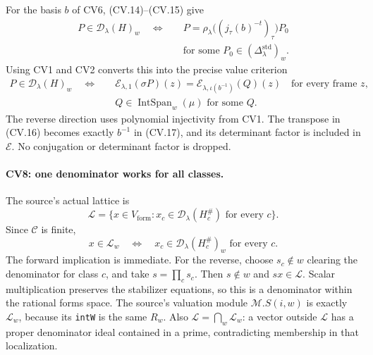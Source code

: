 \documentclass[11pt,a4paper]{article}
\numberwithin{equation}{section}
\theoremstyle{remark}\newtheorem{remark}[theorem]{Remark}
\begin{document}
For the basis \(b\) of CV6, (CV.14)--(CV.15) give
\[
 \begin{split}
 P\in\mathcal D_\lambda(H)_w
 \quad\Longleftrightarrow\quad&
 P=\rho_\lambda\bigl((j_\tau(b)^{-t})_\tau\bigr)P_0\\
 &\text{for some }
             P_0\in(\Delta_\lambda^{\mathrm{std}})_w.
 \end{split}                                                   \tag{CV.16}
\]
Using CV1 and CV2 converts this into the precise value
criterion
\[
 \begin{split}
 P\in\mathcal D_\lambda(H)_w
 \quad\Longleftrightarrow\quad&
 \mathcal E_{\lambda,1}(\sigma P)(z)
      =\mathcal E_{\lambda,\iota(b^{-1})}(Q)(z)
                       \quad\text{for every frame }z,\\
 & Q\in\operatorname{IntSpan}_w(\mu)
                  \text{ for some }Q .
 \end{split}                                                   \tag{CV.17}
\]
The reverse direction uses polynomial injectivity from CV1.
The transpose in (CV.16) becomes exactly \(b^{-1}\) in
(CV.17), and its determinant factor is included in
\(\mathcal E\). No conjugation or determinant factor is
dropped.

\paragraph{CV8: one denominator works for all classes.}
The source's actual lattice is
\[
 \mathcal L=
 \{x\in V_{\mathrm{form}}:
                x_c\in\mathcal D_\lambda(H_c^\#)
                               \text{ for every }c\}.
                                                               \tag{CV.18}
\]
Since \(\mathcal C\) is finite,
\[
 x\in\mathcal L_w
 \quad\Longleftrightarrow\quad
 x_c\in\mathcal D_\lambda(H_c^\#)_w
                              \text{ for every }c.            \tag{CV.19}
\]
The forward implication is immediate. For the reverse,
choose \(s_c\notin w\) clearing the denominator for class
\(c\), and take \(s=\prod_c s_c\).
Then \(s\notin w\) and \(sx\in\mathcal L\).
Scalar multiplication preserves the stabilizer equations,
so this is a denominator within the rational forms space.
The source's valuation module \(\mathcal M.S(i,w)\)
is exactly \(\mathcal L_w\), because its \texttt{intW}
is the same \(R_w\). Also
\(\mathcal L=\bigcap_w\mathcal L_w\): a vector outside
\(\mathcal L\) has a proper denominator ideal contained
in a prime, contradicting membership in that localization.
\end{document}

